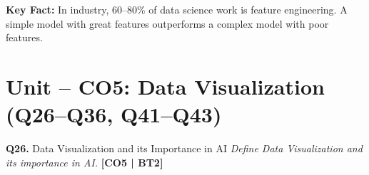 \documentclass[12pt,a4paper]{article}
\newcommand{\Qno}[1]{\textbf{\color{darkred}Q#1.}}
\begin{document}
\begin{answerenv}
\begin{keypoint}
\textbf{Key Fact:} In industry, 60--80\% of data science work is feature engineering. A simple model with great features outperforms a complex model with poor features.
\end{keypoint}

\end{answerenv}

\newpage

\section{Unit -- CO5: Data Visualization (Q26--Q36, Q41--Q43)}

\begin{questionbox}{\Qno{26} Data Visualization and its Importance in AI}
\textit{Define Data Visualization and its importance in AI.} \hfill \textbf{[CO5 | BT2]}
\end{questionbox}
\end{document}
